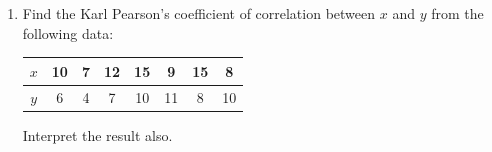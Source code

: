 \begin{enumerate}[label=\thesubsection.\arabic*, ref=\thesubsection.\theenumi]
\begin{figure}[H]
		The following code stimulates the result.
		\noindent{}
	\end{figure}
	\begin{enumerate}[label=\brak{\alph*}]
		\item Applying the Trapezoidal Rule formula from \eqref{eq:trapezoidal_rule} with $h = \frac{\pi/2 - 0}{4} = \frac{\pi}{8}$:
		Evaluating $f\brak{x} = \frac{\sin^2 x}{\sin x + \cos x}$ at nodes $x_k = \frac{k\pi}{8}$ for $k=0,1,2,3,4$:
		\begin{align}
			y_0 &= f\brak{0} = 0, \quad y_1 = f\brak{\frac{\pi}{8}} \approx 0.1118 \\
			y_2 &= f\brak{\frac{\pi}{4}} \approx 0.3536, \quad y_3 = f\brak{\frac{3\pi}{8}} \approx 0.6010, \quad y_4 = f\brak{\frac{\pi}{2}} = 1.0000
		\end{align}
		Applying \eqref{eq:trapezoidal_rule}:
		\begin{align}
			I &\approx \frac{\pi}{16} \sbrak{y_0 + 2\brak{y_1 + y_2 + y_3} + y_4} \approx 0.6151
		\end{align}
		\item Applying \eqref{eq:trapezoidal_rule} with $h = \frac{\pi}{4}$:
		Evaluating $g\brak{x} = \frac{x\sin x}{1+\cos^2 x}$ at nodes $x_k = \frac{k\pi}{4}$ for $k=0,1,2,3,4$:
		\begin{align}
			y_0 = 0, \quad y_1 \approx 0.3702, \quad y_2 \approx 1.5708, \quad y_3 \approx 1.1107, \quad y_4 = 0
		\end{align}
		Applying \eqref{eq:trapezoidal_rule}:
		\begin{align}
			I &\approx \frac{\pi}{8} \sbrak{y_0 + 2\brak{y_1 + y_2 + y_3} + y_4} \approx 2.3968
		\end{align}
	\end{enumerate}
	
	\item Find the Karl Pearson's coefficient of correlation between $x$ and $y$ from the following data:
	\begin{center}
		\begin{tabular}{|c|c|c|c|c|c|c|c|}
			\hline
			$x$ & 10 & 7 & 12 & 15 & 9 & 15 & 8 \\ \hline
			$y$ & 6 & 4 & 7 & 10 & 11 & 8 & 10 \\ \hline
		\end{tabular}
	\end{center}
	Interpret the result also. \hfill {}
	

\end{enumerate}

